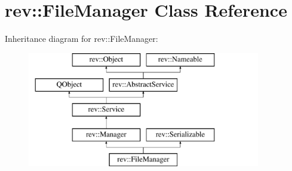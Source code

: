 \hypertarget{classrev_1_1_file_manager}{}\section{rev\+::File\+Manager Class Reference}
\label{classrev_1_1_file_manager}
Inheritance diagram for rev\+::File\+Manager\+:\begin{figure}[H]
\begin{center}
\leavevmode
\includegraphics[height=5.000000cm]{classrev_1_1_file_manager}
\end{center}
\end{figure}
